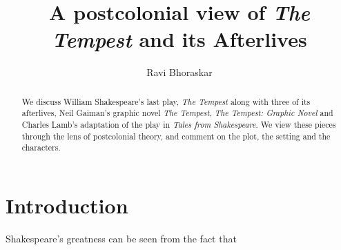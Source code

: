 \documentclass[twocolumn]{article}
\title{A postcolonial view of \emph{The Tempest} and its Afterlives}
\author {Ravi Bhoraskar}
\begin{document}
\maketitle
\begin{abstract}
  We discuss William Shakespeare's last play, \emph{The Tempest} along with three of its afterlives, Neil Gaiman's graphic novel \emph{The Tempest}, \emph{The Tempest: Graphic Novel} and Charles Lamb's adaptation of the play in \emph{Tales from Shakespeare}. We view these pieces through the lens of postcolonial theory, and comment on the plot, the setting and the characters.
\end{abstract}

\section{Introduction}
Shakespeare's greatness can be seen from the fact that 
\end{document}

